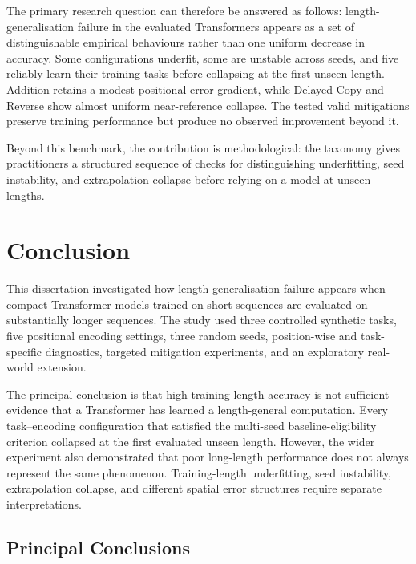 \documentclass[
    author={Aanchala Ravindra Bhongade},
    supervisor={Dr. Fernando Moreno-Pino},
    degree={MSc},
    title={Length Generalisation in Transformer-Based Sequence Models: Failure Taxonomy and Mitigation Strategies},
    subtitle={},
    type={},
    year={2026}
]{dissertation}
\begin{document}
The primary research question can therefore be answered as follows:
length-generalisation failure in the evaluated Transformers appears as a set of distinguishable empirical behaviours rather than one uniform decrease in accuracy. Some configurations underfit, some are unstable across seeds, and five reliably learn their training tasks before collapsing at the first unseen length. Addition retains a modest positional error gradient, while
Delayed Copy and Reverse show almost uniform near-reference collapse. The tested valid mitigations preserve training performance but produce no observed improvement beyond it.

Beyond this benchmark, the contribution is methodological: the taxonomy gives practitioners a structured sequence of checks for distinguishing underfitting, seed instability, and extrapolation collapse before relying on a model at unseen lengths.



\chapter{Conclusion}
\label{chap:conclusion}

\noindent
This dissertation investigated how length-generalisation failure appears when compact Transformer models trained on short sequences are evaluated on substantially longer sequences. The study used three controlled synthetic tasks, five positional encoding settings, three random seeds, position-wise and task-specific diagnostics, targeted mitigation experiments, and an exploratory real-world extension.

The principal conclusion is that high training-length accuracy is not sufficient evidence that a Transformer has learned a length-general computation. Every task--encoding configuration that satisfied the multi-seed baseline-eligibility criterion collapsed at the first evaluated unseen length. However, the wider experiment also demonstrated that poor long-length performance does not always represent the same phenomenon. Training-length underfitting, seed instability, extrapolation collapse, and different spatial error structures require separate interpretations.

\section{Principal Conclusions}
\end{document}
